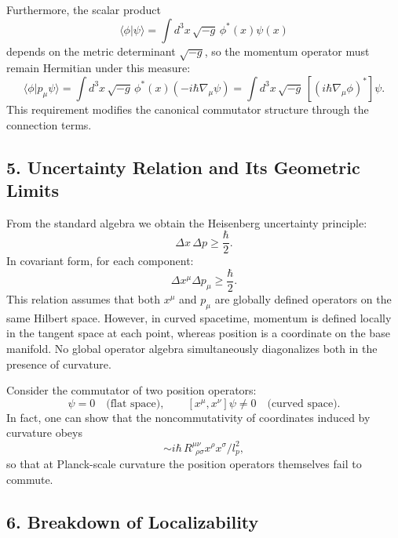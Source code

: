 \documentclass[11pt,oneside]{book}
\numberwithin{equation}{chapter}
\begin{document}
Furthermore, the scalar product
\begin{equation}
\langle \phi|\psi\rangle = \int d^3x\,\sqrt{-g}\,\phi^*(x)\psi(x)
\end{equation}
depends on the metric determinant $\sqrt{-g}$, so the momentum operator must remain Hermitian under this measure:
\begin{equation}
\langle \phi|p_\mu\psi\rangle =
\int d^3x\,\sqrt{-g}\,\phi^*(x)(-i\hbar\nabla_\mu\psi)
=
\int d^3x\,\sqrt{-g}\,[(i\hbar\nabla_\mu\phi)^*]\psi.
\end{equation}
This requirement modifies the canonical commutator structure through the connection terms.

\subsection*{5. Uncertainty Relation and Its Geometric Limits}

From the standard algebra we obtain the Heisenberg uncertainty principle:
\begin{equation}
\Delta x\,\Delta p \ge \frac{\hbar}{2}.
\end{equation}
In covariant form, for each component:
\begin{equation}
\Delta x^\mu \Delta p_\mu \ge \frac{\hbar}{2}.
\end{equation}
This relation assumes that both $x^\mu$ and $p_\mu$ are globally defined operators on the same Hilbert space.  
However, in curved spacetime, momentum is defined locally in the tangent space at each point, whereas position is a coordinate on the base manifold.  
No global operator algebra simultaneously diagonalizes both in the presence of curvature.

Consider the commutator of two position operators:
\begin{equation}
[x^\mu,x^\nu]\psi =
0 \quad \text{(flat space)},
\qquad
[x^\mu,x^\nu]\psi \neq 0 \quad \text{(curved space)}.
\end{equation}
In fact, one can show that the noncommutativity of coordinates induced by curvature obeys
\begin{equation}
[x^\mu,x^\nu] \sim i\hbar\,R^{\mu\nu}_{\ \ \rho\sigma}x^\rho x^\sigma/l_p^2,
\end{equation}
so that at Planck-scale curvature the position operators themselves fail to commute.

\subsection*{6. Breakdown of Localizability}
\end{document}
